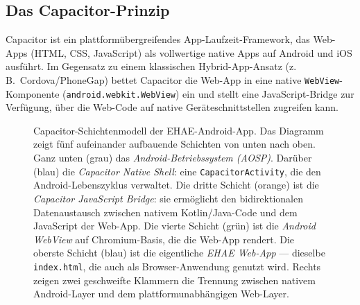 ﻿\documentclass[12pt,a4paper]{article}
\begin{document}
\subsection{Das Capacitor-Prinzip}

Capacitor ist ein plattformübergreifendes App-Laufzeit-Framework, das Web-Apps
(HTML, CSS, JavaScript) als vollwertige native Apps auf Android und iOS ausführt.
Im Gegensatz zu einem klassischen Hybrid-App-Ansatz (z.\,B.\ Cordova/PhoneGap)
bettet Capacitor die Web-App in eine native \texttt{WebView}-Komponente
(\texttt{android.webkit.WebView}) ein und stellt eine JavaScript-Bridge zur Verfügung,
über die Web-Code auf native Geräteschnittstellen zugreifen kann.

\begin{figure}[h]
\centering
{}
\caption{Capacitor-Schichtenmodell der EHAE-Android-App. Das Diagramm zeigt fünf
  aufeinander aufbauende Schichten von unten nach oben. Ganz unten (grau) das
  \emph{Android-Betriebssystem (AOSP)}. Darüber (blau) die \emph{Capacitor Native
  Shell}: eine \texttt{CapacitorActivity}, die den Android-Lebenszyklus verwaltet.
  Die dritte Schicht (orange) ist die \emph{Capacitor JavaScript Bridge}: sie
  ermöglicht den bidirektionalen Datenaustausch zwischen nativem Kotlin/Java-Code
  und dem JavaScript der Web-App. Die vierte Schicht (grün) ist die
  \emph{Android WebView} auf Chromium-Basis, die die Web-App rendert.
  Die oberste Schicht (blau) ist die eigentliche \emph{EHAE Web-App} --- dieselbe
  \texttt{index.html}, die auch als Browser-Anwendung genutzt wird. Rechts zeigen
  zwei geschweifte Klammern die Trennung zwischen nativem Android-Layer und dem
  plattformunabhängigen Web-Layer.}
\label{fig:capacitor_stack}
\end{figure}
\end{document}
